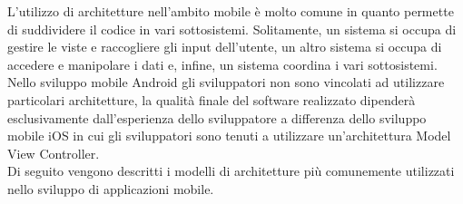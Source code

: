 \documentclass[12pt]{report}
\begin{document}
L'utilizzo di architetture nell'ambito mobile è molto comune in quanto permette di suddividere il codice in vari sottosistemi. Solitamente, un sistema si occupa di gestire le viste e raccogliere gli input dell'utente, un altro sistema si occupa di accedere e manipolare i dati e, infine, un sistema coordina i vari sottosistemi. Nello sviluppo mobile Android gli sviluppatori non sono vincolati ad utilizzare particolari architetture, la qualità finale del software realizzato dipenderà esclusivamente dall'esperienza dello sviluppatore a differenza dello sviluppo mobile iOS in cui gli sviluppatori sono tenuti a utilizzare un'architettura Model View Controller.\\
Di seguito vengono descritti i modelli di architetture più comunemente utilizzati nello sviluppo di applicazioni mobile.
\end{document}
